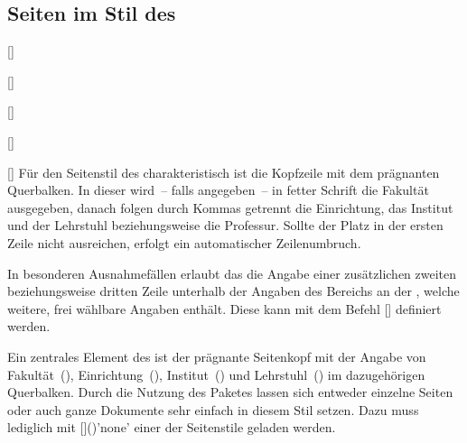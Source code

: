 \begin{Declaration*}{}
\begin{Declaration*}{}
\begin{Declaration*}{}
\subsection{Seiten im Stil des \CDs}
%
%
%
\begin{Declaration}{[]}
\begin{Declaration}{[]}
\begin{Declaration}{[]}
\begin{Declaration}{[]}
\begin{Declaration}{[]}
\printdeclarationlist%
%
%
%
Für den Seitenstil des \TUDCDs charakteristisch ist die Kopfzeile mit dem 
prägnanten Querbalken. In dieser wird~-- falls angegeben~-- in fetter Schrift 
die Fakultät ausgegeben, danach folgen durch Kommas getrennt die Einrichtung, 
das Institut und der Lehrstuhl beziehungsweise die Professur. Sollte der Platz 
in der ersten Zeile nicht ausreichen, erfolgt ein automatischer Zeilenumbruch.

In besonderen Ausnahmefällen erlaubt das \CD die Angabe einer zusätzlichen
zweiten beziehungsweise dritten Zeile unterhalb der Angaben des Bereichs an der 
\TnUD, welche weitere, frei wählbare Angaben enthält. Diese kann mit dem Befehl 
[] definiert werden.
\end{Declaration}
\end{Declaration}
\end{Declaration}
\end{Declaration}
\end{Declaration}
%
\begin{Declaration}[v2.02]{}
\begin{Declaration}[v2.02]{}
\begin{Declaration}[v2.02]{}
\printdeclarationlist%
%
Ein zentrales Element des \TUDCDs ist der prägnante Seitenkopf mit der Angabe 
von Fakultät~(), Einrichtung~(), 
Institut~() und Lehrstuhl~() im dazugehörigen 
Querbalken. Durch die Nutzung des Paketes  lassen 
sich entweder einzelne Seiten oder auch ganze Dokumente sehr einfach in diesem 
Stil setzen. Dazu muss lediglich mit 
[]()'none' einer 
der Seitenstile geladen werden. 


\end{Declaration}
\end{Declaration}
\end{Declaration}
\end{Declaration*}
\end{Declaration*}
\end{Declaration*}
